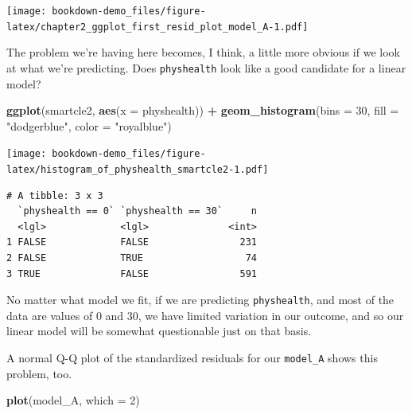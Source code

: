 \documentclass[]{book}
\newenvironment{Shaded}{\begin{snugshade}}{\end{snugshade}}
\newcommand{\KeywordTok}[1]{\textcolor[rgb]{0.13,0.29,0.53}{\textbf{#1}}}
\newcommand{\DataTypeTok}[1]{\textcolor[rgb]{0.13,0.29,0.53}{#1}}
\newcommand{\DecValTok}[1]{\textcolor[rgb]{0.00,0.00,0.81}{#1}}
\newcommand{\StringTok}[1]{\textcolor[rgb]{0.31,0.60,0.02}{#1}}
\newcommand{\OperatorTok}[1]{\textcolor[rgb]{0.81,0.36,0.00}{\textbf{#1}}}
\newcommand{\NormalTok}[1]{#1}
\theoremstyle{definition}
\theoremstyle{definition}
\theoremstyle{definition}
\theoremstyle{remark}
\begin{document}
\texttt{[image: bookdown-demo\_files/figure-latex/chapter2\_ggplot\_first\_resid\_plot\_model\_A-1.pdf]}

The problem we're having here becomes, I think, a little more obvious if
we look at what we're predicting. Does \texttt{physhealth} look like a
good candidate for a linear model?

\begin{Shaded}
\begin{Highlighting}[]
\KeywordTok{ggplot}\NormalTok{(smartcle2, }\KeywordTok{aes}\NormalTok{(}\DataTypeTok{x =}\NormalTok{ physhealth)) }\OperatorTok{+}
\KeywordTok{geom_histogram}\NormalTok{(}\DataTypeTok{bins =} \DecValTok{30}\NormalTok{, }\DataTypeTok{fill =} \StringTok{"dodgerblue"}\NormalTok{, }\DataTypeTok{color =} \StringTok{"royalblue"}\NormalTok{)}
\end{Highlighting}
\end{Shaded}

\texttt{[image: bookdown-demo\_files/figure-latex/histogram\_of\_physhealth\_smartcle2-1.pdf]}

\begin{Shaded}
\end{Shaded}

\begin{verbatim}
# A tibble: 3 x 3
  `physhealth == 0` `physhealth == 30`     n
  <lgl>             <lgl>              <int>
1 FALSE             FALSE                231
2 FALSE             TRUE                  74
3 TRUE              FALSE                591
\end{verbatim}

No matter what model we fit, if we are predicting \texttt{physhealth},
and most of the data are values of 0 and 30, we have limited variation
in our outcome, and so our linear model will be somewhat questionable
just on that basis.

A normal Q-Q plot of the standardized residuals for our
\texttt{model\_A} shows this problem, too.

\begin{Shaded}
\begin{Highlighting}[]
\KeywordTok{plot}\NormalTok{(model_A, }\DataTypeTok{which =} \DecValTok{2}\NormalTok{)}
\end{Highlighting}
\end{Shaded}
\end{document}
